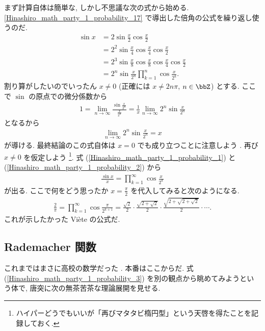 \documentclass[openany, a4paper, oneside]{jsbook}
\begin{document}
まず計算自体は簡単な, しかし不思議な次の式から始める.
\ref{Hinashiro_math_party_1_probability_17} で導出した倍角の公式を繰り返し使うのだ.
\begin{align}
 \sin x
 &=
 2 \sin \frac{x}{2} \cos \frac{x}{2} \\
 &=
 2^2 \sin \frac{x}{4} \cos \frac{x}{4} \cos \frac{x}{2} \\
 &=
 2^3 \sin \frac{x}{8} \cos \frac{x}{8} \cos \frac{x}{4} \cos \frac{x}{2} \\
 &=
 2^n \sin \frac{x}{2^n} \prod_{k=1}^n \cos \frac{x}{2^k}. \label{Hinashiro_math_party_1_probability_1}
\end{align}
割り算がしたいのでいったん $x \neq 0$ (正確には $x \neq 2n \pi$, $n \in \bbZ$) とする.
ここで $\sin$ の原点での微分係数から
\begin{align}
 1
 =
 \lim_{n \to \infty} \frac{\sin \frac{x}{2^n}}{\frac{x}{2^{n}}}
 =
 \frac{1}{x} \lim_{n \to \infty} 2^n \sin \frac{x}{2^n}
\end{align}
となるから
\begin{align}
 \lim_{n \to \infty} 2^n \sin \frac{x}{2^n}
 =
 x \label{Hinashiro_math_party_1_probability_2}
\end{align}
が導ける.
最終結論のこの式自体は $x=0$ でも成り立つことに注意しよう \footnotemark[55]{}.
再び $x \neq 0$ を仮定しよう \footnote{ハイパーどうでもいいが「再びマタタビ楕円型」という天啓を得たことを記録しておく.}.
式 (\ref{Hinashiro_math_party_1_probability_1}) と (\ref{Hinashiro_math_party_1_probability_2}) から
\begin{align}
 \frac{\sin x}{x}
 =
 \prod_{k=1}^{\infty} \cos \frac{x}{2^{k}} \label{Hinashiro_math_party_1_probability_3}
\end{align}
が出る.
ここで何をどう思ったか $x = \frac{\pi}{2}$ を代入してみると次のようになる.
\begin{align}
 \frac{2}{\pi}
 =
 \prod_{k=1}^{\infty} \cos \frac{\pi}{2^{k+1}}
 =
 \frac{\sqrt{2}}{2} \cdot \frac{\sqrt{2 + \sqrt{2}}}{2} \cdot \frac{\sqrt{2 + \sqrt{2 + \sqrt{2}}}}{2} \cdot \cdots.
\end{align}
これが示したかった Vi\`ete の公式だ.


\subsection{Rademacher 関数}

これまではまさに高校の数学だった \footnotemark[52]{}.
本番はここからだ.
式 (\ref{Hinashiro_math_party_1_probability_3}) を別の観点から眺めてみようという体で,
唐突に次の無茶苦茶な理論展開を見せる.
\end{document}
